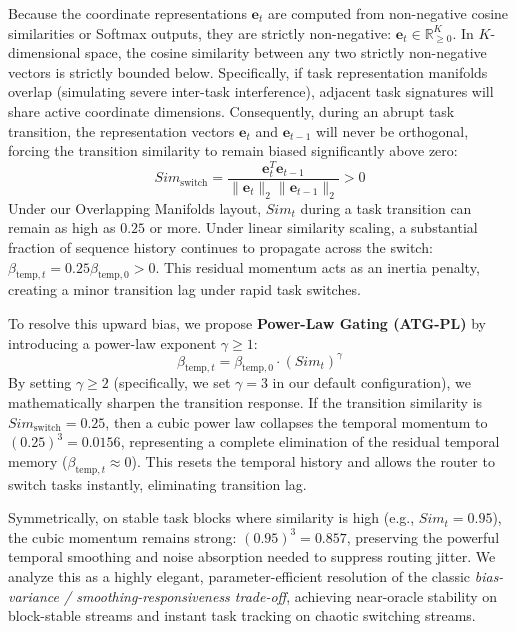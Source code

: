 Because the coordinate representations $\mathbf{e}_t$ are computed from non-negative cosine similarities or Softmax outputs, they are strictly non-negative: $\mathbf{e}_t \in \mathbb{R}^K_{\ge 0}$. In $K$-dimensional space, the cosine similarity between any two strictly non-negative vectors is strictly bounded below. Specifically, if task representation manifolds overlap (simulating severe inter-task interference), adjacent task signatures will share active coordinate dimensions. Consequently, during an abrupt task transition, the representation vectors $\mathbf{e}_t$ and $\mathbf{e}_{t-1}$ will never be orthogonal, forcing the transition similarity to remain biased significantly above zero:
\begin{equation}
    Sim_{\text{switch}} = \frac{\mathbf{e}_t^T \mathbf{e}_{t-1}}{\|\mathbf{e}_t\|_2 \|\mathbf{e}_{t-1}\|_2} > 0
\end{equation}
Under our Overlapping Manifolds layout, $Sim_t$ during a task transition can remain as high as $0.25$ or more. Under linear similarity scaling, a substantial fraction of sequence history continues to propagate across the switch: $\beta_{\text{temp}, t} = 0.25 \beta_{\text{temp}, 0} > 0$. This residual momentum acts as an inertia penalty, creating a minor transition lag under rapid task switches.

To resolve this upward bias, we propose \textbf{Power-Law Gating (ATG-PL)} by introducing a power-law exponent $\gamma \ge 1$:
\begin{equation}
    \beta_{\text{temp}, t} = \beta_{\text{temp}, 0} \cdot \left(Sim_t\right)^\gamma
\end{equation}
By setting $\gamma \ge 2$ (specifically, we set $\gamma = 3$ in our default configuration), we mathematically sharpen the transition response. If the transition similarity is $Sim_{\text{switch}} = 0.25$, then a cubic power law collapses the temporal momentum to $(0.25)^3 = 0.0156$, representing a complete elimination of the residual temporal memory ($\beta_{\text{temp}, t} \approx 0$). This resets the temporal history and allows the router to switch tasks instantly, eliminating transition lag. 

Symmetrically, on stable task blocks where similarity is high (e.g., $Sim_t = 0.95$), the cubic momentum remains strong: $(0.95)^3 = 0.857$, preserving the powerful temporal smoothing and noise absorption needed to suppress routing jitter. We analyze this as a highly elegant, parameter-efficient resolution of the classic \emph{bias-variance / smoothing-responsiveness trade-off}, achieving near-oracle stability on block-stable streams and instant task tracking on chaotic switching streams.

